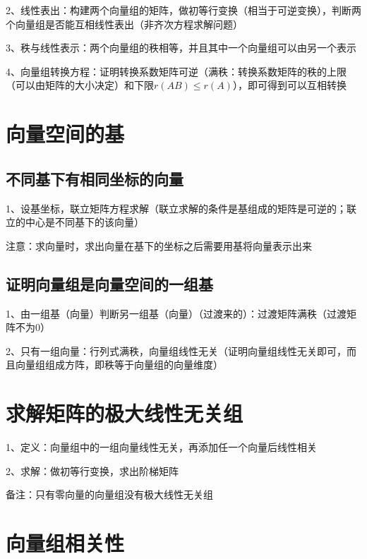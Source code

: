 2、线性表出：构建两个向量组的矩阵，做初等行变换（相当于可逆变换），判断两个向量组是否能互相线性表出（非齐次方程求解问题）

3、秩与线性表示：两个向量组的秩相等，并且其中一个向量组可以由另一个表示 

4、向量组转换方程：证明转换系数矩阵可逆（满秩：转换系数矩阵的秩的上限（可以由矩阵的大小决定）和下限$r(AB) \le r(A)$），即可得到可以互相转换

\section{向量空间的基}



\subsection{不同基下有相同坐标的向量}

1、设基坐标，联立矩阵方程求解（联立求解的条件是基组成的矩阵是可逆的；联立的中心是不同基下的该向量）

注意：求向量时，求出向量在基下的坐标之后需要用基将向量表示出来



\subsection{证明向量组是向量空间的一组基}

1、由一组基（向量）判断另一组基（向量）（过渡来的）：过渡矩阵满秩（过渡矩阵不为0）

2、只有一组向量：行列式满秩，向量组线性无关（证明向量组线性无关即可，而且向量组组成方阵，即秩等于向量组的向量维度）

\section{求解矩阵的极大线性无关组}

1、定义：向量组中的一组向量线性无关，再添加任一个向量后线性相关

2、求解：做初等行变换，求出阶梯矩阵

备注：只有零向量的向量组没有极大线性无关组

\section{向量组相关性}



